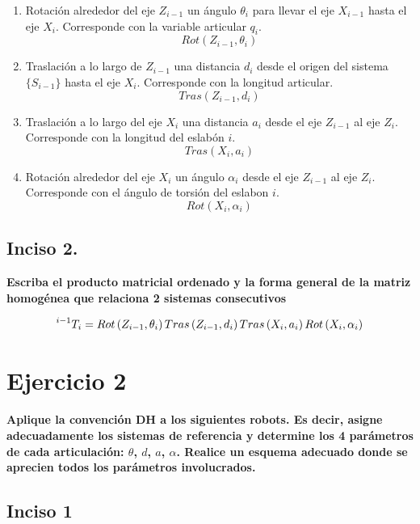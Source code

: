 \documentclass[a4paper,12pt]{article}
\begin{document}
\begin{enumerate}
    \item Rotación alrededor del eje $Z_{i-1}$ un ángulo $\theta_i$ para llevar el eje $X_{i-1}$ hasta el eje $X_i$. Corresponde con la variable articular $q_i$.
    \[Rot\left(Z_{i-1}, \theta_i\right)\]
    \item Traslación a lo largo de $Z_{i-1}$ una distancia $d_i$ desde el origen del sistema $\{S_{i-1}\}$ hasta el eje $X_i$. Corresponde con la longitud articular.
    \[Tras\left(Z_{i-1}, d_i\right)\]
    \item Traslación a lo largo del eje $X_i$ una distancia $a_i$ desde el eje $Z_{i-1}$ al eje $Z_{i}$. Corresponde con la longitud del eslabón $i$.
    \[Tras\left(X_{i}, a_i\right)\]
    \item Rotación alrededor del eje $X_{i}$ un ángulo $\alpha_i$ desde el eje $Z_{i-1}$ al eje $Z_{i}$. Corresponde con el ángulo de torsión del eslabon $i$.
    \[Rot\left(X_{i}, \alpha_i\right)\]
\end{enumerate}

\subsection{Inciso 2.}
\textbf{Escriba el producto matricial ordenado y la forma general de la matriz homogénea
que relaciona 2 sistemas consecutivos}

\[\prescript{i-1}{}{T_i} = Rot\left(Z_{i-1}, \theta_i\right) Tras\left(Z_{i-1}, d_i\right) Tras\left(X_{i}, a_i\right) Rot\left(X_{i}, \alpha_i\right)\]

\section{Ejercicio 2}
\textbf{Aplique la convención DH a los siguientes robots. Es decir, asigne adecuadamente
los sistemas de referencia y determine los 4 parámetros de cada articulación: $\theta$, $d$, $a$, $\alpha$. Realice
un esquema adecuado donde se aprecien todos los parámetros involucrados.}

\subsection{Inciso 1}
\label{subsec: robot 1}
\end{document}
